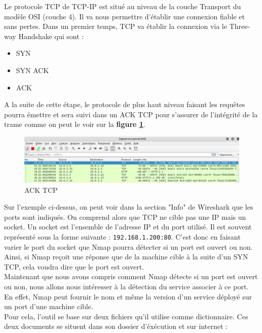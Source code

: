 Le protocole TCP de TCP-IP est situé au niveau de la couche Transport du modèle OSI (couche 4). Il va nous permettre d'établir une connexion fiable et sans pertes. Dans un premier temps, TCP va établir la connexion via le Three-way Handshake qui sont :

\begin{itemize}
    \item SYN
    \item SYN ACK
    \item ACK
\end{itemize}

A la suite de cette étape, le protocole de plus haut niveau faisant les requêtes pourra émettre et sera suivi dans un ACK TCP pour s'assurer de l'intégrité de la trame comme on peut le voir sur la \textbf{figure \ref{fig:acktcp}}.

\begin{figure}[htp!]
  \centering
  \setlength\figureheight{7cm}
  \setlength\figurewidth{9cm}
  \includegraphics[width=1\textwidth]{oui/Ancien/imangeancien/Nikto/wireshark1.PNG}
  \caption{ACK TCP}
  \label{fig:acktcp}
\end{figure}

Sur l'exemple ci-dessus, on peut voir dans la section "Info" de Wireshark que les ports sont indiqués. On comprend alors que TCP ne cible pas une IP mais un socket. Un socket est l'ensemble de l'adresse IP et du port utilisé. Il est souvent représenté sous la forme suivante : \verb+192.168.1.200:80+. C'est donc en faisant varier le port du socket que Nmap pourra détecter si un port est ouvert ou non. Ainsi, si Nmap reçoit une réponse que de la machine cible à la suite d'un SYN TCP, cela voudra dire que le port est ouvert.\\
Maintenant que nous avons compris comment Nmap détecte si un port est ouvert ou non, nous allons nous intéresser à la détection du service associer à ce port. En effet, Nmap peut fournir le nom et même la version d'un service déployé sur un port d'une machine cible.\\

 Pour cela, l'outil se base sur deux fichiers qu'il utilise comme dictionnaire. Ces deux documents se situent dans son dossier d'éxécution et sur internet :

